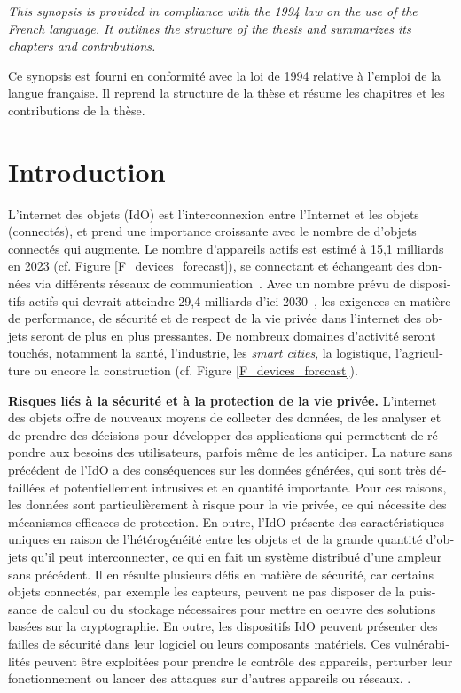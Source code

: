 \emph{This synopsis is provided in compliance with the 1994 law on the use of the French language. It outlines the structure of the thesis and summarizes its chapters and contributions.}

\begin{otherlanguage}{french}
    
Ce synopsis est fourni en conformité avec la loi de 1994 relative à l'emploi de la langue française. Il reprend la structure de la thèse et résume les chapitres et les contributions de la thèse. 


\section*{Introduction}

L'internet des objets (IdO) est l'interconnexion entre l'Internet et les objets (connectés), et prend une importance croissante avec le nombre de d'objets connectés qui augmente. Le nombre d'appareils actifs est estimé à 15,1 milliards en 2023 (cf. Figure \ref{F_devices_forecast}), se connectant et échangeant des données via différents réseaux de communication~\cite{StatistaIoT2023}. Avec un nombre prévu de dispositifs actifs qui devrait atteindre 29,4 milliards d'ici 2030~\cite{StatistaIoT2023}, les exigences en matière de performance, de sécurité et de respect de la vie privée dans l'internet des objets seront de plus en plus pressantes. De nombreux domaines d'activité seront touchés, notamment la santé, l'industrie, les \emph{smart cities}, la logistique, l'agriculture ou encore la construction (cf. Figure \ref{F_devices_forecast}).
 
\textbf{Risques liés à la sécurité et à la protection de la vie privée.}
L'internet des objets offre de nouveaux moyens de collecter des données, de les analyser et de prendre des décisions
pour développer des applications qui permettent de répondre aux besoins des utilisateurs, parfois même de les anticiper. La nature sans précédent de l'IdO a des conséquences sur les données générées, qui sont très détaillées et potentiellement intrusives et en quantité importante. Pour ces raisons, les données sont
particulièrement à risque pour la vie privée, ce qui nécessite des mécanismes efficaces de protection. En outre, l'IdO présente des
caractéristiques uniques en raison de l'hétérogénéité entre les objets et de la grande quantité d'objets qu'il peut interconnecter, ce qui en fait un système distribué d'une ampleur sans précédent. Il en résulte plusieurs défis en matière de sécurité, car certains objets connectés, par exemple les capteurs, peuvent ne pas disposer de la puissance de calcul ou du stockage nécessaires pour mettre en oeuvre des solutions basées sur la cryptographie. 
En outre, les dispositifs IdO peuvent présenter des failles de sécurité dans leur logiciel ou leurs composants matériels. Ces vulnérabilités peuvent être exploitées pour prendre le contrôle des appareils, perturber leur fonctionnement ou lancer des attaques sur d'autres appareils ou réseaux. \cite{Omolara2022}.


\end{otherlanguage}
